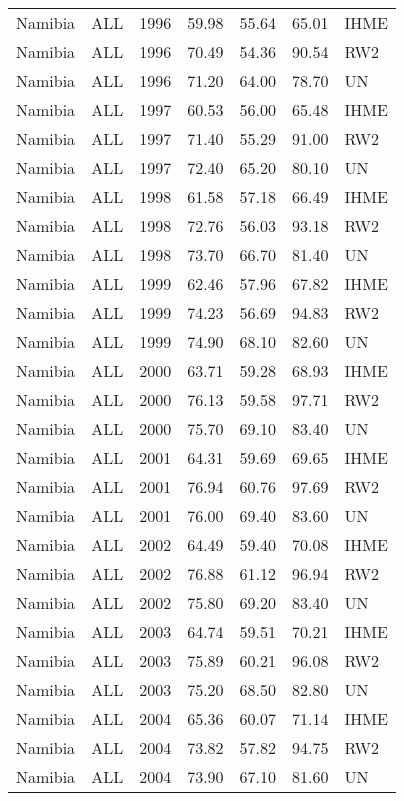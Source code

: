 \begin{longtable}{lllrrrl}
  Namibia & ALL & 1996 & 59.98 & 55.64 & 65.01 & IHME \\ 
  Namibia & ALL & 1996 & 70.49 & 54.36 & 90.54 & RW2 \\ 
  Namibia & ALL & 1996 & 71.20 & 64.00 & 78.70 & UN \\ 
  Namibia & ALL & 1997 & 60.53 & 56.00 & 65.48 & IHME \\ 
  Namibia & ALL & 1997 & 71.40 & 55.29 & 91.00 & RW2 \\ 
  Namibia & ALL & 1997 & 72.40 & 65.20 & 80.10 & UN \\ 
  Namibia & ALL & 1998 & 61.58 & 57.18 & 66.49 & IHME \\ 
  Namibia & ALL & 1998 & 72.76 & 56.03 & 93.18 & RW2 \\ 
  Namibia & ALL & 1998 & 73.70 & 66.70 & 81.40 & UN \\ 
  Namibia & ALL & 1999 & 62.46 & 57.96 & 67.82 & IHME \\ 
  Namibia & ALL & 1999 & 74.23 & 56.69 & 94.83 & RW2 \\ 
  Namibia & ALL & 1999 & 74.90 & 68.10 & 82.60 & UN \\ 
  Namibia & ALL & 2000 & 63.71 & 59.28 & 68.93 & IHME \\ 
  Namibia & ALL & 2000 & 76.13 & 59.58 & 97.71 & RW2 \\ 
  Namibia & ALL & 2000 & 75.70 & 69.10 & 83.40 & UN \\ 
  Namibia & ALL & 2001 & 64.31 & 59.69 & 69.65 & IHME \\ 
  Namibia & ALL & 2001 & 76.94 & 60.76 & 97.69 & RW2 \\ 
  Namibia & ALL & 2001 & 76.00 & 69.40 & 83.60 & UN \\ 
  Namibia & ALL & 2002 & 64.49 & 59.40 & 70.08 & IHME \\ 
  Namibia & ALL & 2002 & 76.88 & 61.12 & 96.94 & RW2 \\ 
  Namibia & ALL & 2002 & 75.80 & 69.20 & 83.40 & UN \\ 
  Namibia & ALL & 2003 & 64.74 & 59.51 & 70.21 & IHME \\ 
  Namibia & ALL & 2003 & 75.89 & 60.21 & 96.08 & RW2 \\ 
  Namibia & ALL & 2003 & 75.20 & 68.50 & 82.80 & UN \\ 
  Namibia & ALL & 2004 & 65.36 & 60.07 & 71.14 & IHME \\ 
  Namibia & ALL & 2004 & 73.82 & 57.82 & 94.75 & RW2 \\ 
  Namibia & ALL & 2004 & 73.90 & 67.10 & 81.60 & UN \\ 

\end{longtable}
